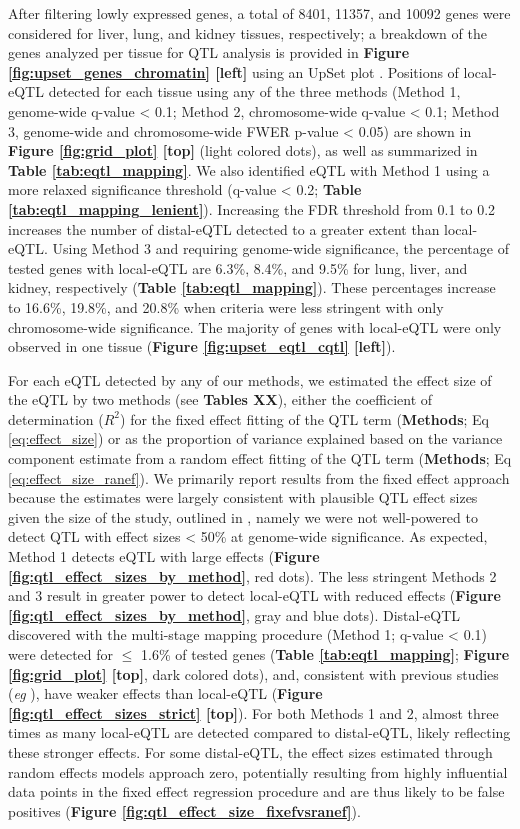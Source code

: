\documentclass[9pt,twocolumn,twoside]{gsajnl}
\begin{document}
After filtering lowly expressed genes, a total of 8401, 11357, and 10092 genes were considered for liver, lung, and kidney tissues, respectively; a breakdown of the genes analyzed per tissue for QTL analysis is provided in \textbf{Figure \ref{fig:upset_genes_chromatin} [left]} using an UpSet plot \citep{Conway2017}. Positions of local-eQTL detected for each tissue using any of the three methods (Method 1, genome-wide q-value < 0.1; Method 2, chromosome-wide q-value < 0.1; Method 3, genome-wide and chromosome-wide FWER p-value < 0.05)  are shown in \textbf{Figure \ref{fig:grid_plot} [top]} (light colored dots), as well as summarized in \textbf{Table \ref{tab:eqtl_mapping}}. We also identified eQTL with Method 1 using a more relaxed significance threshold (q-value < 0.2; \textbf{Table \ref{tab:eqtl_mapping_lenient}}). Increasing the FDR threshold from 0.1 to 0.2 increases the number of distal-eQTL detected to a greater extent than local-eQTL. Using Method 3 and requiring genome-wide significance, the percentage of tested genes with local-eQTL are 6.3\%, 8.4\%, and 9.5\% for lung, liver, and kidney, respectively (\textbf{Table \ref{tab:eqtl_mapping}}). These percentages increase to 16.6\%, 19.8\%, and 20.8\% when criteria were less stringent with only chromosome-wide significance. The majority of genes with local-eQTL were only observed in one tissue (\textbf{Figure \ref{fig:upset_eqtl_cqtl} [left]}).

For each eQTL detected by any of our methods, we estimated the effect size of the eQTL by two methods (see \textbf{Tables XX}), either the coefficient of determination ($R^{2}$) for the fixed effect fitting of the QTL term (\textbf{Methods}; Eq \ref{eq:effect_size}) or as the proportion of variance explained based on the variance component estimate from a random effect fitting of the QTL term (\textbf{Methods}; Eq \ref{eq:effect_size_ranef}). We primarily report results from the fixed effect approach because the estimates were largely consistent with plausible QTL effect sizes given the size of the study, outlined in \cite{KeeleSPARCC}, namely we were not well-powered to detect QTL with effect sizes < 50\% at genome-wide significance. As expected, Method 1 detects eQTL with large effects (\textbf{Figure \ref{fig:qtl_effect_sizes_by_method}}, red dots). The less stringent Methods 2 and 3 result in greater power to detect local-eQTL with reduced effects (\textbf{Figure \ref{fig:qtl_effect_sizes_by_method}}, gray and blue dots). Distal-eQTL discovered with the multi-stage mapping procedure (Method 1; q-value < 0.1) were detected for $\leq$ 1.6\% of tested genes (\textbf{Table \ref{tab:eqtl_mapping}}; \textbf{Figure \ref{fig:grid_plot} [top]}, dark colored dots), and, consistent with previous studies (\textit{eg} \citealt{Chick2016}), have weaker effects than local-eQTL (\textbf{Figure \ref{fig:qtl_effect_sizes_strict} [top]}). For both Methods 1 and 2, almost three times as many local-eQTL are detected compared to distal-eQTL, likely reflecting these stronger effects. For some distal-eQTL, the effect sizes estimated through random effects models approach zero, potentially resulting from highly influential data points in the fixed effect regression procedure and are thus likely to be false positives (\textbf{Figure \ref{fig:qtl_effect_size_fixefvsranef}}). 
\end{document}
